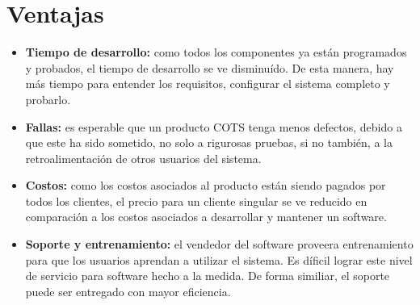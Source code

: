 \documentclass{udpreport}
\begin{document}
	\section{Ventajas}
	\begin{itemize}
		\item \textbf{Tiempo de desarrollo:} como todos los componentes ya están programados y probados, el tiempo de desarrollo se ve disminuído. De esta manera, hay más tiempo para entender los requisitos, configurar el sistema completo y probarlo.
		
		\item \textbf{Fallas:} es esperable que un producto COTS tenga menos defectos, debido a que este ha sido sometido, no solo a rigurosas pruebas, si no también, a la retroalimentación de otros usuarios del sistema. 
		
		\item \textbf{Costos:} como los costos asociados al producto están siendo pagados por todos los clientes, el precio para un cliente singular se ve reducido en comparación a los costos asociados a desarrollar y mantener un software.
		
		\item \textbf{Soporte y entrenamiento:} el vendedor del software proveera entrenamiento para que los usuarios aprendan a utilizar el sistema. Es díficil lograr este nivel de servicio para software hecho a la medida. De forma similiar, el soporte  puede ser entregado con mayor eficiencia.
		
	\end{itemize}
\end{document}

